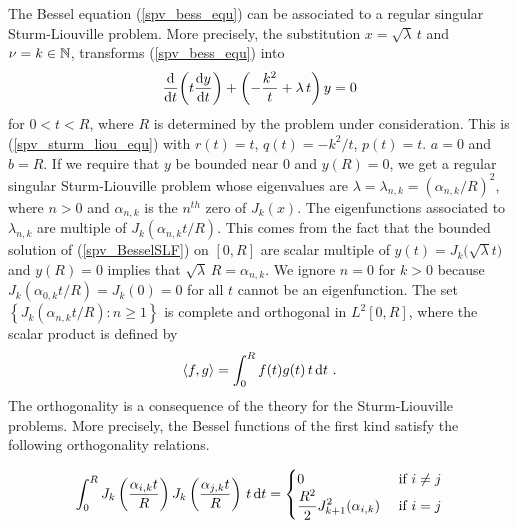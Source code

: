 The Bessel equation (\ref{spv_bess_equ}) can be associated to a
regular singular Sturm-Liouville problem.  More precisely, the
substitution $x= \sqrt{\lambda}\, t$ and $\nu = k \in \NN$, transforms
(\ref{spv_bess_equ}) into
\begin{equation}\label{spv_BesselSLF}
\dfdx{ \left( t \dydx{y}{t}\right)}{t} + \left( - \frac{k^2}{t} +
\lambda\, t\right)  y = 0
\end{equation}
for $0 < t < R$, where $R$ is determined by the problem under
consideration.  This is (\ref{spv_sturm_liou_equ}) with $r(t) = t$,
$\displaystyle q(t)= -k^2/t$,
$p(t)=t$. $a=0$ and $b=R$.  If we require that $y$ be bounded near
$0$ and $y(R)=0$, we get a regular singular Sturm-Liouville problem
whose eigenvalues are
$\displaystyle \lambda = \lambda_{n,k} = \left(\alpha_{n,k}/R\right)^2$,
where $n > 0$ and $\alpha_{n,k}$ is the $n^{th}$ zero of $J_k(x)$.
The eigenfunctions associated to $\lambda_{n,k}$ are multiple of
$\displaystyle J_k\left(\alpha_{n,k} t/R\right)$.
This comes from the fact that the bounded solution of
(\ref{spv_BesselSLF}) on $[0,R]$ are scalar multiple of
$\displaystyle y(t) = J_k\big(\sqrt{\lambda} t\big)$ and
$y(R) = 0$ implies that $\sqrt{\lambda}\, R = \alpha_{n,k}$.
We ignore $n=0$ for $k>0$ because
$\displaystyle J_k\left(\alpha_{0,k} t/R\right) = J_k\left(0\right) = 0$
for all $t$ cannot be an eigenfunction.  The set
$\displaystyle \left\{ J_k\left(\alpha_{n,k} t/R\right) : n \geq 1 \right\}$
is complete and orthogonal in $L^2[0,R]$, where the
scalar product is defined by
\[
\ps{f}{g} = \int_0^R f(t)g(t) \, t \dx{t} \ .
\]
The orthogonality is a consequence of the theory for the
Sturm-Liouville problems.  More precisely, the Bessel functions of the
first kind satisfy the following orthogonality relations.

\begin{prop}
\[
\int_0^R J_k\left(\frac{\alpha_{i,k} t}{R}\right)
J_k\left(\frac{\alpha_{j,k} t}{R}\right)\, t \dx{t} =
\begin{cases}
0 & \mbox{ if } i \neq j \\
\displaystyle \frac{R^2}{2} J_{k+1}^2(\alpha_{i,k}) & \mbox{ if } i = j
\end{cases}
\]
\end{prop}

